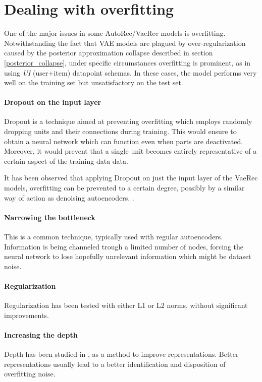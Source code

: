 \section{Dealing with overfitting}

One of the major issues in some AutoRec/VaeRec models
is overfitting. 
Notwithstanding the fact that VAE models are plagued by
over-regularization caused by the posterior approximation collapse described in section
\ref{posterior_collapse}, under specific circumstances overfitting is prominent,
as in using \emph{UI} (user+item) datapoint schemas.
In these cases, the model performs very well on the training
set but unsatisfactory on the test set.

\paragraph{Dropout on the input layer}
Dropout \cite{Srivastava2014}
is a technique aimed at preventing overfitting
which employs randomly dropping units
and their connections
during training.
This would ensure to obtain a neural network
which can function even when parts are deactivated.
Moreover, it would prevent that a single unit becomes
entirely representative of a certain aspect of the training data
data.

It has been observed that applying Dropout on just the input layer
of the VaeRec models,
overfitting can be prevented to a certain degree,
possibly by a similar way of action as denoising autoencoders.
\cite{Vincent2010}.

\paragraph{Narrowing the bottleneck}
This is a common technique, typically used with regular autoencoders.
Information is being channeled trough a limited number of nodes,
forcing the neural network to lose hopefully unrelevant information
which might be dataset noise.
\paragraph{Regularization}
Regularization has been tested with either L1 or L2 norms,
without significant improvements.
\paragraph{Increasing the depth}
Depth has been studied in \cite{MhaskarLP17},\cite{Poggio2015}
as a method to improve representations. Better representations usually lead
to a better identification and disposition of overfitting noise. 
